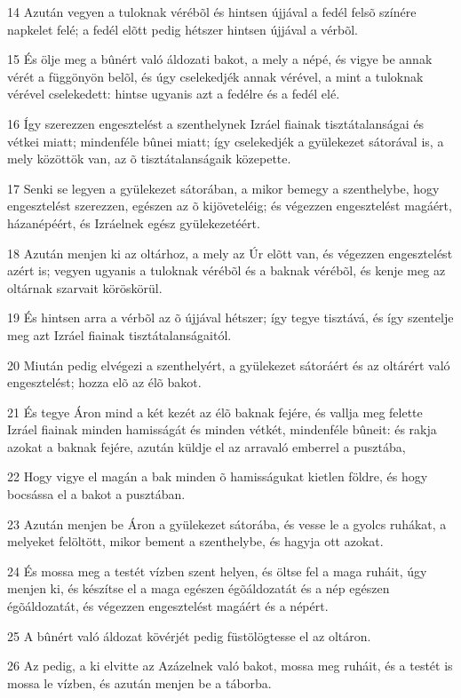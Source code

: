 \par 14 Azután vegyen a tuloknak vérébõl és hintsen újjával a fedél felsõ színére napkelet felé; a fedél elõtt pedig hétszer hintsen újjával a vérbõl.
\par 15 És ölje meg a bûnért való áldozati bakot, a mely a népé, és vigye be annak vérét a függönyön belõl, és úgy cselekedjék annak vérével, a mint a tuloknak vérével cselekedett: hintse ugyanis azt a fedélre és a fedél elé.
\par 16 Így szerezzen engesztelést a szenthelynek Izráel fiainak tisztátalanságai és vétkei miatt; mindenféle bûnei miatt; így cselekedjék a gyülekezet sátorával is, a mely közöttök van, az õ tisztátalanságaik közepette.
\par 17 Senki se legyen a gyülekezet sátorában, a mikor bemegy a szenthelybe, hogy engesztelést szerezzen, egészen az õ kijöveteléig; és végezzen engesztelést magáért, házanépéért, és Izráelnek egész gyülekezetéért.
\par 18 Azután menjen ki az oltárhoz, a mely az Úr elõtt van, és végezzen engesztelést azért is; vegyen ugyanis a tuloknak vérébõl és a baknak vérébõl, és kenje meg az oltárnak szarvait köröskörül.
\par 19 És hintsen arra a vérbõl az õ újjával hétszer; így tegye tisztává, és így szentelje meg azt Izráel fiainak tisztátalanságaitól.
\par 20 Miután pedig elvégezi a szenthelyért, a gyülekezet sátoráért és az oltárért való engesztelést; hozza elõ az élõ bakot.
\par 21 És tegye Áron mind a két kezét az élõ baknak fejére, és vallja meg felette Izráel fiainak minden hamisságát és minden vétkét, mindenféle bûneit: és rakja azokat a baknak fejére, azután küldje el az arravaló emberrel a pusztába,
\par 22 Hogy vigye el magán a bak minden õ hamisságukat kietlen földre, és hogy bocsássa el a bakot a pusztában.
\par 23 Azután menjen be Áron a gyülekezet sátorába, és vesse le a gyolcs ruhákat, a melyeket felöltött, mikor bement a szenthelybe, és hagyja ott azokat.
\par 24 És mossa meg a testét vízben szent helyen, és öltse fel a maga ruháit, úgy menjen ki, és készítse el a maga egészen égõáldozatát és a nép egészen égõáldozatát, és végezzen engesztelést magáért és a népért.
\par 25 A bûnért való áldozat kövérjét pedig füstölögtesse el az oltáron.
\par 26 Az pedig, a ki elvitte az Azázelnek való bakot, mossa meg ruháit, és a testét is mossa le vízben, és azután menjen be a táborba.
